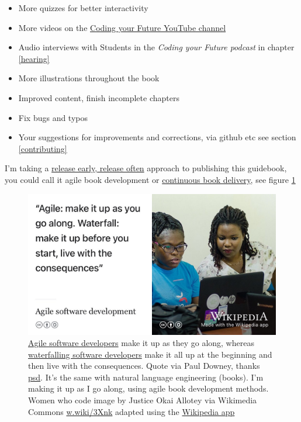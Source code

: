 \documentclass[
]{book}
\providecommand{\tightlist}{%
  \setlength{\itemsep}{0pt}\setlength{\parskip}{0pt}}
\begin{document}
\begin{itemize}
\tightlist
\item
  More quizzes for better interactivity
\item
  More videos on the \href{https://www.youtube.com/channel/UCLBv_u8JmyUPqmRALIjVnLg}{Coding your Future YouTube channel}
\item
  Audio interviews with Students in the \emph{Coding your Future podcast} in chapter \ref{hearing}
\item
  More illustrations throughout the book
\item
  Improved content, finish incomplete chapters
\item
  Fix bugs and typos
\item
  Your suggestions for improvements and corrections, via github etc see section \ref{contributing}
\end{itemize}

I'm taking a \href{https://en.wikipedia.org/wiki/Release_early,_release_often}{release early, release often} \citep{Raymond1999} approach to publishing this guidebook, you could call it agile book development or \href{https://en.wikipedia.org/wiki/Continuous_delivery}{continuous book delivery}, see figure \ref{fig:agile-vs-waterfall-fig} \citep{realagile}

\begin{figure}

{\centering \includegraphics[width=1\linewidth]{images/agile-vs-waterfall} 

}

\caption{\href{https://en.wikipedia.org/wiki/Agile_software_development}{Agile software developers} make it up as they go along, whereas \href{https://en.wikipedia.org/wiki/Waterfall_model}{waterfalling software developers} make it all up at the beginning and then live with the consequences. Quote via Paul Downey, thanks \href{https://twitter.com/psd/status/568324759521501184}{psd}. It's the same with natural language engineering (books). I'm making it up as I go along, using agile book development methods. Women who code image by Justice Okai Allotey via Wikimedia Commons \href{https://w.wiki/3Xnk}{w.wiki/3Xnk} adapted using the \href{https://apps.apple.com/us/app/wikipedia/id324715238}{Wikipedia app}}\label{fig:agile-vs-waterfall-fig}
\end{figure}
\end{document}
